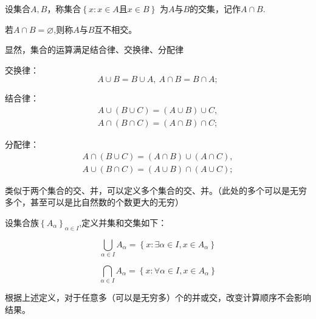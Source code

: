 \begin{definition}
    设集合$A,B$，称集合$\left\{x: x\in A \text{且} x \in B \right\}$ 为$A$与$B$的交集，记作$A \cap B$.

    若$A \cap B = \varnothing$,则称$A$与$B$互不相交。
\end{definition}

显然，集合的运算满足结合律、交换律、分配律

\begin{theorem}
 
    
    交换律：
    \begin{equation}
        A\cup B = B \cup A,\ A\cap B = B\cap A;
    \end{equation}

    结合律：
    \begin{equation}
    \begin{split}
        A\cup (B\cup C) = (A \cup B) \cup C ,  \\  
        A\cap (B\cap C) = (A \cap B) \cap C;
    \end{split}
    \end{equation}

    分配律：
    \begin{equation}
    \begin{split}
        A\cap (B\cup C) = (A\cap B)\cup (A\cap C), \\
        A\cup (B\cap C) = (A\cup B)\cap (A\cup C);
    \end{split}
    \end{equation}
\end{theorem}

类似于两个集合的交、并，可以定义多个集合的交、并。（此处的多个可以是无穷多个，甚至可以是比自然数的个数更大的无穷）

\begin{definition}
    设集合族$\left\{A_\alpha \right\}_{\alpha \in I}$,定义并集和交集如下：

    \begin{equation*}
        \bigcup_{\alpha \in I}A_\alpha = \left\{ x: \exists \alpha \in I, x \in A_\alpha \right\} 
    \end{equation*}

    \begin{equation*}
        \bigcap_{\alpha \in I} A_\alpha = \left\{ x:\forall \alpha \in I, x\in A_\alpha \right\}
    \end{equation*}
\end{definition}

根据上述定义，对于任意多（可以是无穷多）个的并或交，改变计算顺序不会影响结果。

